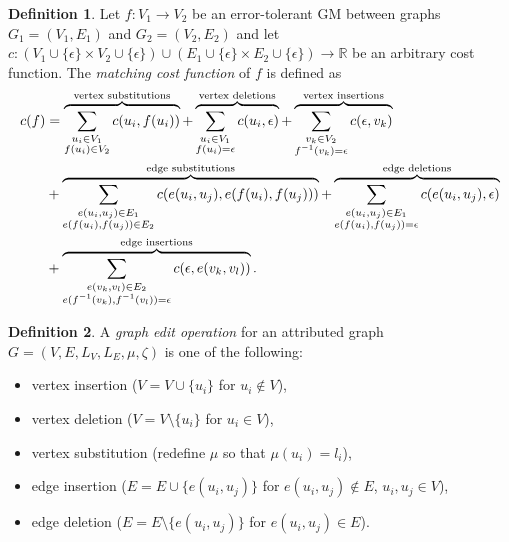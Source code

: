 \documentclass{article}
\theoremstyle{definition}
\newtheorem{definition}{Definition}
\begin{document}
\begin{definition}
  Let $f: V_1 \to V_2$ be an error-tolerant GM between graphs $G_1 = (V_1, E_1)$ and $G_2 = (V_2, E_2)$ and let $c: (V_1 \cup \{ \epsilon \} \times V_2 \cup \{ \epsilon \}) \cup (E_1 \cup \{ \epsilon \} \times E_2 \cup \{ \epsilon \}) \to \mathbb{R}$ be an arbitrary cost function. The \emph{matching cost function} of $f$ is defined as
  \[
  \begin{aligned}
    c(f) &= \overbrace{\sum_{\substack{u_i \in V_1\\ f(u_i) \in V_2}} c(u_i, f(u_i))}^{\mathclap{\text{vertex substitutions}}} + \overbrace{\sum_{\substack{u_i \in V_1\\ f(u_i) = \epsilon}} c(u_i, \epsilon)}^{\mathclap{\text{vertex deletions}}} + \overbrace{\sum_{\substack{v_k \in V_2\\ f^{-1}(v_k) = \epsilon}} c(\epsilon, v_k)}^{\mathclap{\text{vertex insertions}}} \\
    &+ \overbrace{\sum_{\substack{e(u_i, u_j) \in E_1\\ e(f(u_i), f(u_j)) \in E_2}} c(e(u_i, u_j), e(f(u_i), f(u_j)))}^{\mathclap{\text{edge substitutions}}} + \overbrace{\sum_{\substack{e(u_i, u_j) \in E_1\\ e(f(u_i), f(u_j)) = \epsilon}} c(e(u_i, u_j), \epsilon)}^{\mathclap{\text{edge deletions}}} \\
    &+ \overbrace{\sum_{\substack{e(v_k, v_l) \in E_2\\ e(f^{-1}(v_k), f^{-1}(v_l)) = \epsilon}} c(\epsilon, e(v_k, v_l))}^{\mathclap{\text{edge insertions}}}.
  \end{aligned}
  \]
\end{definition}
\begin{definition}
  A \emph{graph edit operation} for an attributed graph $G = (V, E, L_V, L_E, \mu, \zeta)$ is one of the following:
  \begin{itemize}
  \item vertex insertion ($V = V \cup \{ u_i \}$ for $u_i \not \in V$),
  \item vertex deletion ($V = V \setminus \{ u_i \}$ for $u_i \in V$),
  \item vertex substitution (redefine $\mu$ so that $\mu(u_i) = l_i$),
  \item edge insertion ($E = E \cup \{ e(u_i, u_j) \}$ for $e(u_i, u_j) \not \in E$, $u_i, u_j \in V$),
  \item edge deletion ($E = E \setminus \{ e(u_i, u_j) \}$ for $e(u_i, u_j) \in E$).
  \end{itemize}
\end{definition}
\end{document}
